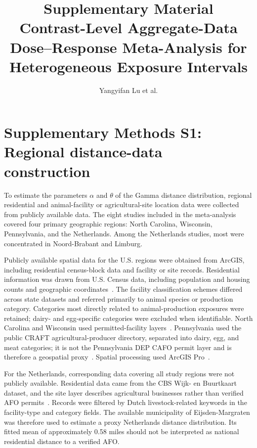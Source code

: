 \documentclass[11pt]{article}
\title{Supplementary Material\\
Contrast-Level Aggregate-Data Dose--Response Meta-Analysis for Heterogeneous Exposure Intervals}
\author{Yangyifan Lu et al.}
\date{}
\begin{document}
\maketitle

\section*{Supplementary Methods S1: Regional distance-data construction}

To estimate the parameters $\alpha$ and $\theta$ of the Gamma distance
distribution, regional residential and animal-facility or agricultural-site location data were collected from
publicly available data. The eight studies included in the meta-analysis
covered four primary geographic regions: North Carolina, Wisconsin,
Pennsylvania, and the Netherlands. Among the Netherlands studies, most were
concentrated in Noord-Brabant and Limburg.

Publicly available spatial data for the U.S. regions were obtained from
ArcGIS, including residential census-block data and facility or site records.
Residential information was drawn from U.S. Census data, including population
and housing counts and geographic coordinates~\cite{US_Census}. The facility
classification schemes differed across state datasets and referred primarily
to animal species or production category. Categories most directly related to
animal-production exposures were retained; dairy- and egg-specific categories
were excluded when identifiable. North Carolina and Wisconsin used
permitted-facility layers~\cite{NC_CAFO,Wisconsin_cafo}. Pennsylvania used the
public CRAFT agricultural-producer directory, separated into dairy, egg, and
meat categories; it is not the Pennsylvania DEP CAFO permit layer and is
therefore a geospatial proxy~\cite{PA_CAFO,PA_DEP_CAFO}.
Spatial processing used ArcGIS Pro~\cite{Esri_ArcGISPro}.

For the Netherlands, corresponding data covering all study regions were not
publicly available. Residential data came from the CBS Wijk- en Buurtkaart
dataset, and the site layer describes agricultural businesses rather than
verified AFO permits~\cite{Netherlands_Cafo,Netherlands_Residents}. Records
were filtered by Dutch livestock-related keywords in the facility-type and
category fields. The available municipality of Eijsden-Margraten was therefore
used to estimate a proxy Netherlands distance distribution. Its fitted mean of
approximately 0.58 miles should not be interpreted as national residential
distance to a verified AFO.
\end{document}
